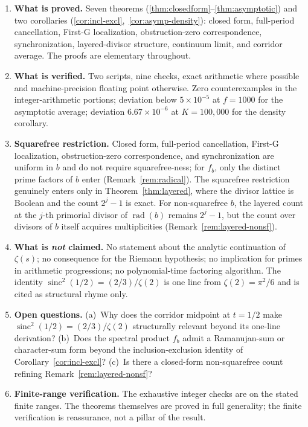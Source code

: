 \documentclass[11pt,reqno]{amsart}
\theoremstyle{plain}
\theoremstyle{definition}
\theoremstyle{remark}
\DeclareMathOperator{\sinc}{sinc}
\DeclareMathOperator{\rad}{rad}
\begin{document}
\begin{enumerate}[label={\upshape(\arabic*)}]
\item \textbf{What is proved.} Seven theorems
(\ref{thm:closedform}--\ref{thm:asymptotic}) and two corollaries
(\ref{cor:incl-excl},~\ref{cor:asymp-density}): closed form, full-period
cancellation, First-G localization, obstruction-zero correspondence,
synchronization, layered-divisor structure, continuum limit, and
corridor average. The proofs are elementary throughout.

\item \textbf{What is verified.} Two scripts, nine checks, exact
arithmetic where possible and machine-precision floating point
otherwise. Zero counterexamples in the integer-arithmetic portions;
deviation below $5 \times 10^{-5}$ at $f = 1000$ for the asymptotic
average; deviation $6.67 \times 10^{-6}$ at $K = 100{,}000$ for the
density corollary.

\item \textbf{Squarefree restriction.} Closed form, full-period
cancellation, First-G localization, obstruction-zero correspondence,
and synchronization are uniform in $b$ and do not require
squarefree-ness; for $f_{b}$, only the distinct prime factors of $b$
enter (Remark~\ref{rem:radical}). The squarefree restriction
genuinely enters only in Theorem~\ref{thm:layered}, where the divisor
lattice is Boolean and the count $2^{j} - 1$ is exact. For
non-squarefree $b$, the layered count at the $j$-th primorial divisor
of $\rad(b)$ remains $2^{j} - 1$, but the count over divisors of $b$
itself acquires multiplicities (Remark~\ref{rem:layered-nonsf}).

\item \textbf{What is \emph{not} claimed.} No statement about the
analytic continuation of $\zeta(s)$; no consequence for the Riemann
hypothesis; no implication for primes in arithmetic progressions; no
polynomial-time factoring algorithm. The identity $\sinc^{2}(1/2) =
(2/3)/\zeta(2)$ is one line from $\zeta(2) = \pi^{2}/6$ and is cited
as structural rhyme only.

\item \textbf{Open questions.} (a)~Why does the corridor midpoint at
$t = 1/2$ make $\sinc^{2}(1/2) = (2/3)/\zeta(2)$ structurally
relevant beyond its one-line derivation? (b)~Does the spectral product
$f_{b}$ admit a Ramanujan-sum or character-sum form beyond the
inclusion-exclusion identity of Corollary~\ref{cor:incl-excl}? (c)~Is
there a closed-form non-squarefree count refining
Remark~\ref{rem:layered-nonsf}?

\item \textbf{Finite-range verification.} The exhaustive integer
checks are on the stated finite ranges. The theorems themselves are
proved in full generality; the finite verification is reassurance,
not a pillar of the result.
\end{enumerate}
\end{document}
